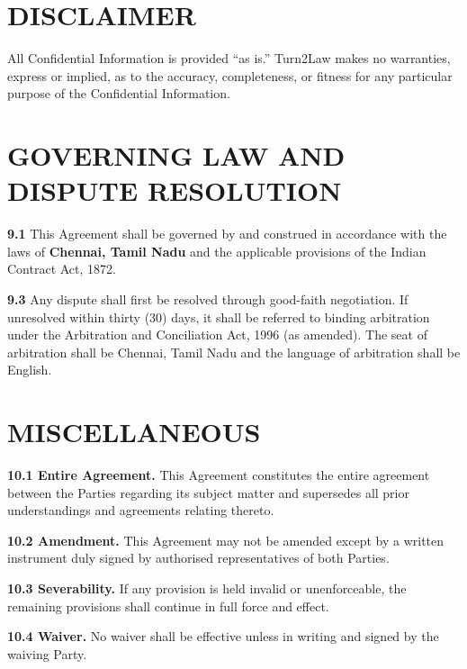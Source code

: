 \documentclass[10pt]{article}
\begin{document}
\section{DISCLAIMER}

All Confidential Information is provided ``as is.'' Turn2Law makes no warranties, express or implied, as to the accuracy, completeness, or fitness for any particular purpose of the Confidential Information.

\section{GOVERNING LAW AND DISPUTE RESOLUTION}

\textbf{9.1} This Agreement shall be governed by and construed in accordance with the laws of \textbf{Chennai, Tamil Nadu} and the applicable provisions of the Indian Contract Act, 1872.


\textbf{9.3} Any dispute shall first be resolved through good-faith negotiation. If unresolved within thirty (30) days, it shall be referred to binding arbitration under the Arbitration and Conciliation Act, 1996 (as amended). The seat of arbitration shall be Chennai, Tamil Nadu and the language of arbitration shall be English.

\section{MISCELLANEOUS}

\textbf{10.1 Entire Agreement.} This Agreement constitutes the entire agreement between the Parties regarding its subject matter and supersedes all prior understandings and agreements relating thereto.

\textbf{10.2 Amendment.} This Agreement may not be amended except by a written instrument duly signed by authorised representatives of both Parties.

\textbf{10.3 Severability.} If any provision is held invalid or unenforceable, the remaining provisions shall continue in full force and effect.

\textbf{10.4 Waiver.} No waiver shall be effective unless in writing and signed by the waiving Party.
\end{document}
